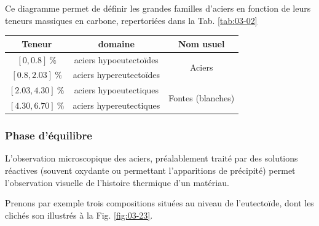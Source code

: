 \documentclass[a4paper]{book}
\begin{document}

Ce diagramme permet de définir les grandes familles d'aciers en fonction de leurs teneurs massiques en carbone, repertoriées dans la Tab. \ref{tab:03-02}

\begin{center}
\begin{minipage}{0.53\textwidth}
\centering
\begin{tabular}{ccc}
\toprule
Teneur & domaine & Nom usuel \\
\midrule
$[0, 0.8] ~ \si{\percent}$ & aciers hypoeutectoïdes & \multirow{2}{*}{Aciers}  \\ 
$[0.8, 2.03] ~ \si{\percent}$ & aciers hypereutectoïdes \\
\midrule
$[2.03, 4.30] ~ \si{\percent}$ & aciers hypoeutectiques & \multirow{2}{*}{Fontes (blanches)}\\
$[4.30, 6.70] ~ \si{\percent}$ & aciers hypereutectiques \\
\bottomrule
\end{tabular}
\end{minipage}\hfill\begin{minipage}{0.43\textwidth}
\label{tab:03-02}
\end{minipage}
\end{center}

\subsubsection{Phase d'équilibre}

L'observation microscopique des aciers, préalablement traité par des solutions réactives (souvent oxydante ou permettant l'apparitions de précipité) permet l'observation visuelle de l'histoire thermique d'un matériau.


Prenons par exemple trois compositions situées au niveau de l'eutectoïde, dont les clichés son illustrés à la Fig. \ref{fig:03-23}. 
\end{document}
